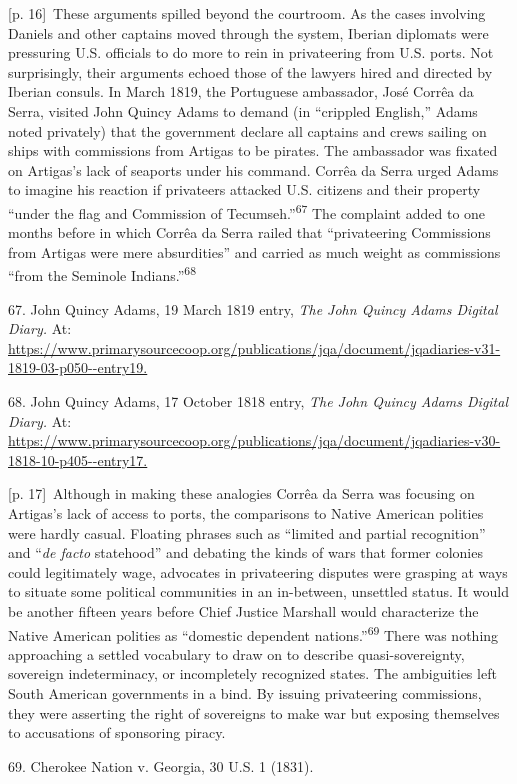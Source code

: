 \documentclass[10pt,a4paper]{article}
\begin{document}
{\scriptsize\color{gray} [p. 16]}\ These arguments spilled beyond the courtroom. As the cases involving Daniels and other captains moved through the system, Iberian diplomats were pressuring U.S. officials to do more to rein in privateering from U.S. ports. Not surprisingly, their arguments echoed those of the lawyers hired and directed by Iberian consuls. In March 1819, the Portuguese ambassador, José Corrêa da Serra, visited John Quincy Adams to demand (in “crippled English,” Adams noted privately) that the government declare all captains and crews sailing on ships with commissions from Artigas to be pirates. The ambassador was fixated on Artigas’s lack of seaports under his command. Corrêa da Serra urged Adams to imagine his reaction if privateers attacked U.S. citizens and their property “under the flag and Commission of Tecumseh.”\nobreak\textsuperscript{67} The complaint added to one months before in which Corrêa da Serra railed that “privateering Commissions from Artigas were mere absurdities” and carried as much weight as commissions “from the Seminole Indians.”\nobreak\textsuperscript{68}\par{\small 67. John Quincy Adams, 19 March 1819 entry, \textit{The John Quincy Adams Digital Diary.} At: \url{https://www.primarysourcecoop.org/publications/jqa/document/jqadiaries-v31-1819-03-p050--entry19.}\par}{\small 68. John Quincy Adams, 17 October 1818 entry, \textit{The John Quincy Adams Digital Diary.} At: \url{https://www.primarysourcecoop.org/publications/jqa/document/jqadiaries-v30-1818-10-p405--entry17.}\par}
{\scriptsize\color{gray} [p. 17]}\ Although in making these analogies Corrêa da Serra was focusing on Artigas’s lack of access to ports, the comparisons to Native American polities were hardly casual. Floating phrases such as “limited and partial recognition” and “\textit{de facto} statehood” and debating the kinds of wars that former colonies could legitimately wage, advocates in privateering disputes were grasping at ways to situate some political communities in an in-between, unsettled status. It would be another fifteen years before Chief Justice Marshall would characterize the Native American polities as “domestic dependent nations.”\nobreak\textsuperscript{69} There was nothing approaching a settled vocabulary to draw on to describe quasi-sovereignty, sovereign indeterminacy, or incompletely recognized states. The ambiguities left South American governments in a bind. By issuing privateering commissions, they were asserting the right of sovereigns to make war but exposing themselves to accusations of sponsoring piracy.\par{\small 69. Cherokee Nation v. Georgia, 30 U.S. 1 (1831).\par}
\end{document}
